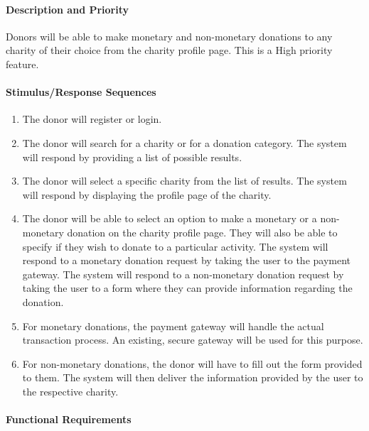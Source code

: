 \documentclass{scrreprt}
\begin{document}
            \paragraph{Description and Priority}\mbox{}\par
                
                Donors will be able to make monetary and non-monetary donations to any charity of their choice from the charity profile page. This is a High priority feature.
            
            \paragraph{Stimulus/Response Sequences}\mbox{}\par
            
                \begin{enumerate}[label=(\alph*)]
                    \item The donor will register or login.
                    \item The donor will search for a charity or for a donation category. The system will respond by providing a list of possible results.
                    \item The donor will select a specific charity from the list of results. The system will respond by displaying the profile page of the charity.
                    \item The donor will be able to select an option to make a monetary or a non-monetary donation on the charity profile page. They will also be able to specify if they wish to donate to a particular activity. The system will respond to a monetary donation request by taking the user to the payment gateway. The system will respond to a non-monetary donation request by taking the user to a form where they can provide information regarding the donation.
                    \item For monetary donations, the payment gateway will handle the actual transaction process. An existing, secure gateway will be used for this purpose.
                    \item For non-monetary donations, the donor will have to fill out the form provided to them. The system will then deliver the information provided by the user to the respective charity.
                \end{enumerate}

            \paragraph{Functional Requirements}\mbox{}\par
        
\end{document}
